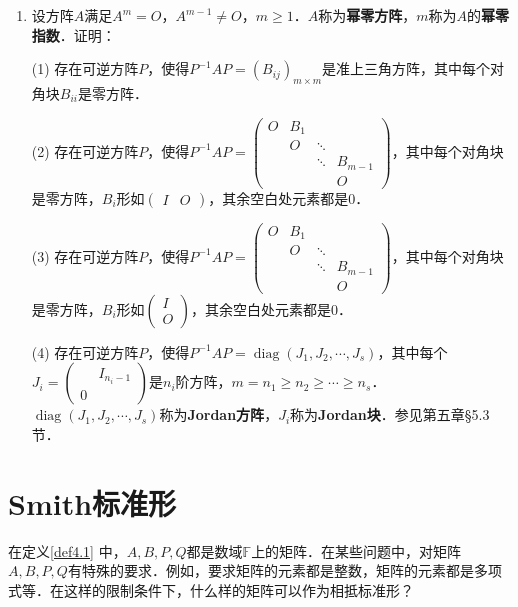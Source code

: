 \documentclass[a4paper,fontset=windows]{ctexbook}
\theoremstyle{definition}
\DeclareMathOperator{\diag}{diag}
\DeclareMathOperator{\rank}{rank}
\renewcommand{\le}{\leqslant}
\renewcommand{\ge}{\geqslant}
\begin{document}
\begin{enumerate}
(3)设$A,B\in\mathbb{F}^{n\times n}$满足$\rank(A+\lambda B)\le\rank(B)<|\mathbb{F}|$，$\forall\lambda\in\mathbb{F}$．你有什么结论？证明之．

\item 设方阵$A$满足$A^m=O$，$A^{m-1}\ne O$，$m\ge 1$．$A$称为{\bf 幂零方阵}，$m$称为$A$的{\bf 幂零指数}．证明：

(1) 存在可逆方阵$P$，使得$P^{-1}AP=(B_{ij})_{m\times m}$是准上三角方阵，其中每个对角块$B_{ii}$是零方阵．

(2) 存在可逆方阵$P$，使得$P^{-1}AP=\begin{pmatrix}O&B_1&& \\ &O&\ddots& \\ &&\ddots&B_{m-1} \\ &&&O\end{pmatrix}$，其中每个对角块是零方阵，$B_i$形如$\begin{pmatrix}I & O\end{pmatrix}$，其余空白处元素都是0．

(3) 存在可逆方阵$P$，使得$P^{-1}AP=\begin{pmatrix}O&B_1&& \\ &O&\ddots& \\ &&\ddots&B_{m-1} \\ &&&O\end{pmatrix}$，其中每个对角块是零方阵，$B_i$形如$\begin{pmatrix}I \\ O\end{pmatrix}$，其余空白处元素都是0．

(4) 存在可逆方阵$P$，使得$P^{-1}AP=\diag(J_1,J_2,\cdots,J_s)$，其中每个$J_i=\begin{pmatrix}&I_{n_i-1} \\ 0&\end{pmatrix}$是$n_i$阶方阵，$m=n_1\ge n_2\ge\cdots\ge n_s$．$\diag(J_1,J_2,\cdots,J_s)$称为{\bf Jordan方阵}，$J_i$称为{\bf Jordan块}．参见第五章\S 5.3节．

\end{enumerate}

\clearpage\section{ Smith标准形}

在定义\ref{def4.1} 中，$A,B,P,Q$都是数域$\mathbb{F}$上的矩阵．在某些问题中，对矩阵$A,B,P,Q$有特殊的要求．例如，要求矩阵的元素都是整数，矩阵的元素都是多项式等．在这样的限制条件下，什么样的矩阵可以作为相抵标准形？
\end{document}
